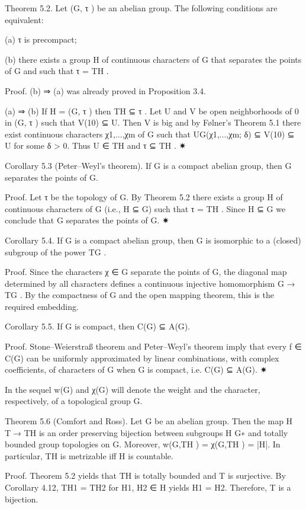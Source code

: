 \documentclass[12pt]{article}
\begin{document}
Theorem 5.2. Let (G, τ ) be an abelian group. The following conditions are equivalent:

(a) τ is precompact;

(b) there exists a group H of continuous characters of G that separates the points of G and such that τ = TH .

Proof. (b) ⇒ (a) was already proved in Proposition 3.4.


(a) ⇒ (b) If H = (G, τ ) then TH ⊆ τ . Let U and V be open neighborhoods of 0 in (G, τ ) such that V(10) ⊆ U. Then V is
big and by Følner’s Theorem 5.1 there exist continuous characters χ1,...,χm of G such that UG(χ1,...,χm; δ) ⊆ V(10) ⊆ U
for some δ > 0. Thus U ∈ TH and τ ⊆ TH . ✷


Corollary 5.3 (Peter–Weyl’s theorem). If G is a compact abelian group, then G separates the points of G.


Proof. Let τ be the topology of G. By Theorem 5.2 there exists a group H of continuous characters of G (i.e., H ⊆ G) such
that τ = TH . Since H ⊆ G we conclude that G separates the points of G. ✷


Corollary 5.4. If G is a compact abelian group, then G is isomorphic to a (closed) subgroup of the power TG .


Proof. Since the characters χ ∈ G separate the points of G, the diagonal map determined by all characters defines a continuous injective homomorphism G 	→ TG . By the compactness of G and the open mapping theorem, this is the required
embedding. 


Corollary 5.5. If G is compact, then C(G) ⊆ A(G).


Proof. Stone–Weierstraß theorem and Peter–Weyl’s theorem imply that every f ∈ C(G) can be uniformly approximated by
linear combinations, with complex coefficients, of characters of G when G is compact, i.e. C(G) ⊆ A(G). ✷


    In the sequel w(G) and χ(G) will denote the weight and the character, respectively, of a topological group G.


Theorem 5.6 (Comfort and Ross). Let G be an abelian group. Then the map H T→ TH is an order preserving bijection between subgroups
H  G∗ and totally bounded group topologies on G. Moreover, w(G,TH ) = χ(G,TH ) = |H|. In particular, TH is metrizable iff H is
countable.


Proof. Theorem 5.2 yields that TH is totally bounded and T is surjective. By Corollary 4.12, TH1 = TH2 for H1, H2 ∈ H yields
H1 = H2. Therefore, T is a bijection.
\end{document}
